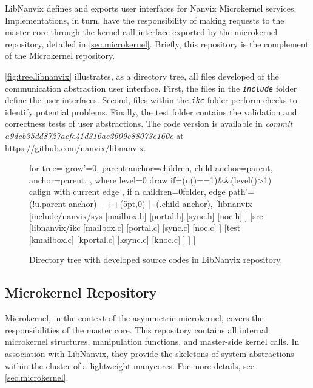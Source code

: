 		LibNanvix defines and exports user interfaces for Nanvix Microkernel
		services. Implementations, in turn, have the responsibility of making
		requests to the master core through the kernel call interface exported
		by the microkernel repository, detailed in \autoref{sec.microkernel}.
		Briefly, this repository is the complement of the Microkernel repository.

		\autoref{fig:tree.libnanvix} illustrates, as a directory tree,
		all files developed of the communication abstraction user
		interface. First, the files in the \textit{\texttt{include}} folder
		define the user interfaces. Second, files within the
		\textit{\texttt{ikc}} folder perform checks to identify potential
		problems. Finally, the test folder contains the validation
		and correctness tests of user abstractions. The code version
		is available in \textit{commit a9dcb35dd8727aefe41d316ac2609c88073e160e}
		at \url{https://github.com/nanvix/libnanvix}.

		\begin{figure}[!ht]
			\centering%
			\caption{Directory tree with developed source codes in LibNanvix repository.}%
			\label{fig:tree.libnanvix}%
			\begin{forest}
			for tree={
				grow'=0,
				parent anchor=children,
				child anchor=parent,
				anchor=parent,
			},
			where level=0{
				draw
			}{
				if={(n()==1)&&(level()>1)}{
				calign with current edge
				}{},
				if n children=0{folder}{},
				edge path'={(!u.parent anchor) -- ++(5pt,0) |- (.child anchor)},
			}
			[libnanvix
				[include/nanvix/sys
					[mailbox.h]
					[portal.h]
					[sync.h]
					[noc.h]
				]
				[src
					[libnanvix/ikc
						[mailbox.c]
						[portal.c]
						[sync.c]
						[noc.c]
					]
					[test
						[kmailbox.c]
						[kportal.c]
						[ksync.c]
						[knoc.c]
					]
				]
			]
			\end{forest}%
		\end{figure}

	\subsection{Microkernel Repository}

		Microkernel, in the context of the asymmetric microkernel, covers the
		responsibilities of the master core. This repository contains all
		internal microkernel structures, manipulation functions, and
		master-side kernel calls. In association with LibNanvix, they provide
		the skeletons of system abstractions within the cluster of a lightweight
		manycores. For more details, see \autoref{sec.microkernel}.

